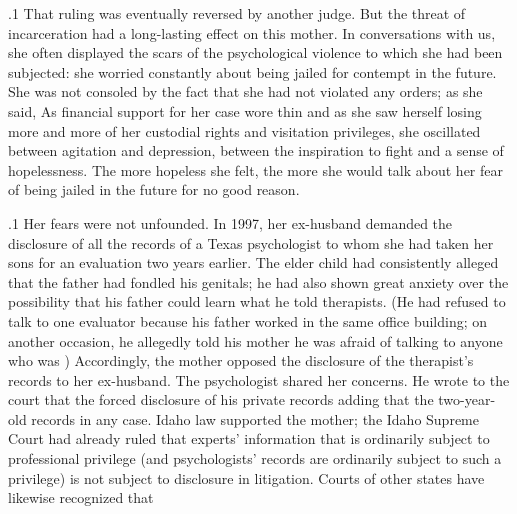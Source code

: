 \documentclass[11pt, twoside]{article}
\begin{document}
{\p.1{%
That ruling was eventually reversed by another judge.
But the threat of
incarceration had a long-lasting effect on this mother. In conversations
with us, she often displayed the scars of the psychological violence to
which she had been subjected: she worried constantly about being jailed
for contempt in the future. She was not consoled by the fact that she had
not violated any orders; as she said,  As financial support for her case wore thin and as she saw herself
losing more and more of her custodial rights and visitation privileges,
she oscillated between agitation and depression, between the inspiration
to fight and a sense of hopelessness. The more hopeless she felt, the more
she would talk about her fear of being jailed in the future for no good
reason.
}%

\p.1{%
Her fears were not unfounded. In 1997, her ex-husband demanded
the disclosure of all the records of a Texas psychologist to whom she
had taken her sons for an evaluation two years earlier. The elder child
had consistently alleged that the father had fondled his genitals; he had
also shown great anxiety over the possibility that his father could learn
what he told therapists. (He had refused to talk to one evaluator because his father worked in the same office building; on another occasion,
he allegedly told his mother he was afraid of talking to anyone who
was ) Accordingly, the mother opposed the
disclosure of the therapist’s records to her ex-husband.
The psychologist shared her concerns. He wrote to the court that the
forced disclosure of his private records  adding that the two-year-old records  in any case. Idaho law supported the mother; the Idaho Supreme Court had already ruled that
experts’ information that is ordinarily subject to professional privilege
(and psychologists’ records are ordinarily subject to such a privilege)
is not subject to disclosure in litigation. Courts of other states have
likewise recognized that 
}%

}
\end{document}
